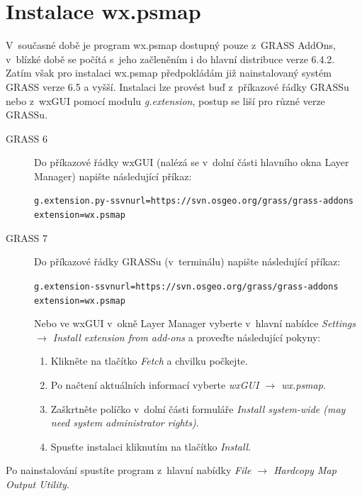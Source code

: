 \documentclass[a4paper,12pt,draft]{article}
\begin{document}
\section{Instalace wx.psmap}
\label{priloha:instalace_GUI}
V~současné době je program wx.psmap dostupný pouze z~GRASS AddOns, v~blízké
době se počítá s~jeho začleněním i do hlavní distribuce verze 6.4.2. Zatím však
pro instalaci wx.psmap předpokládám již nainstalovaný systém GRASS verze 6.5
a vyšší. Instalaci lze provést buď z~příkazové řádky GRASSu nebo z~wxGUI pomocí
modulu \emph{g.extension}, postup se liší pro různé verze GRASSu.


\begin{description}
\item[GRASS 6]
Do příkazové řádky wxGUI (nalézá se v~dolní části hlavního okna Layer Manager)
napište následující příkaz:

\begin{alltt}\footnotesize
g.extension.py -s svnurl=https://svn.osgeo.org/grass/grass-addons
 extension=wx.psmap
\end{alltt}

\item[GRASS 7]
Do příkazové řádky GRASSu (v~terminálu) napište následující příkaz:

\begin{alltt}\footnotesize
g.extension -s svnurl=https://svn.osgeo.org/grass/grass-addons
 extension=wx.psmap
\end{alltt}

Nebo ve wxGUI v~okně Layer Manager vyberte v~hlavní nabídce
\emph{Settings $\rightarrow$ Install extension from add-ons} a proveďte
následující pokyny:
\begin{enumerate}
\item   Klikněte na tlačítko \emph{Fetch} a chvilku počkejte.
\item Po načtení aktuálních informací vyberte \emph{wxGUI $\rightarrow$ wx.psmap}.
\item Zaškrtněte políčko v~dolní části formuláře \emph{Install system-wide (may need system administrator rights)}.
\item Spusťte instalaci kliknutím na tlačítko \emph{Install}.
\end{enumerate}

\end{description}

Po nainstalování spustíte program z~hlavní nabídky \emph{File $\rightarrow$ Hardcopy Map Output Utility}.


\newpage
\end{document}
